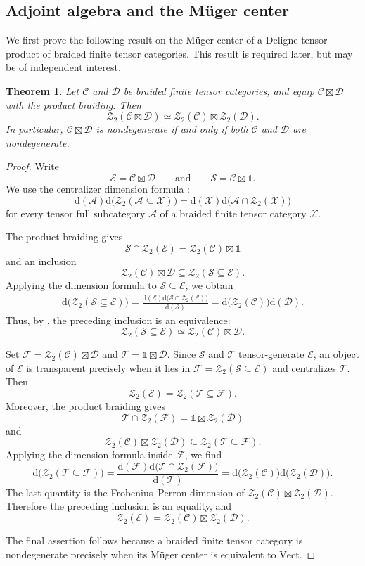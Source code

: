 \documentclass[10pt,a4paper]{amsart}
\numberwithin{equation}{section}
\newtheorem{theorem}[thmctr]{Theorem}
\newcommand{\unit}{\mathds{1}}
\newcommand{\cA}{\mathcal{A}}
\newcommand{\C}{\mathcal{C}}
\newcommand{\D}{\mathcal{D}}
\newcommand{\E}{\mathcal{E}}
\newcommand{\F}{\mathcal{F}}
\newcommand{\Z}{\mathcal{Z}}
\newcommand{\T}{\mathcal{T}}
\newcommand{\cS}{\mathcal{S}}
\newcommand{\FP}{\mathrm{d}}
\newcommand{\Vect}{\mathrm{Vect}}
\begin{document}
\subsection{Adjoint algebra and the M\"uger center}
We first prove the following result on the M\"uger center of a Deligne tensor product of braided finite tensor categories. This result is required later, but may be of independent interest.

\begin{theorem}\label{thm:muger-center-deligne-product}
Let $\C$ and $\D$ be braided finite tensor categories, and
equip $\C\boxtimes\D$ with the product braiding. Then
\[
\Z_2(\C\boxtimes\D)
\simeq
\Z_2(\C)\boxtimes\Z_2(\D).
\]
In particular, $\C\boxtimes\D$ is nondegenerate if and only if
both $\C$ and $\D$ are nondegenerate.
\end{theorem}

\begin{proof}
Write
\[
\E=\C\boxtimes\D
\qquad\text{and}\qquad
\cS=\C\boxtimes\unit.
\]
We use the centralizer dimension formula
\cite[Theorem~4.9]{shimizu2019non}:
\[
\FP(\cA)
\FP\bigl(\Z_2(\cA\subseteq\mathcal X)\bigr)
=
\FP(\mathcal X)
\FP\bigl(\cA\cap\Z_2(\mathcal X)\bigr)
\]
for every tensor full subcategory $\cA$ of a braided finite tensor
category $\mathcal X$.

The product braiding gives
\[
\cS\cap\Z_2(\E)
=
\Z_2(\C)\boxtimes\unit
\]
and an inclusion
\[
\Z_2(\C)\boxtimes\D
\subseteq
\Z_2(\cS\subseteq\E).
\]
Applying the dimension formula to $\cS\subseteq\E$, we obtain
\[
\begin{aligned}
\FP\bigl(\Z_2(\cS\subseteq\E)\bigr)
=
\frac{
 \FP(\E)
 \FP\bigl(\cS\cap\Z_2(\E)\bigr)
}{
 \FP(\cS)
} 
=
\FP\bigl(\Z_2(\C)\bigr)
\FP(\D).
\end{aligned}
\]
Thus, by \cite[Proposition~6.3.3]{etingof2016tensor}, the preceding inclusion is an equivalence:
\[
  \Z_2(\cS\subseteq\E)\simeq\Z_2(\C)\boxtimes\D.
\]

Set $\F = \Z_2(\C)\boxtimes\D$ and $\T=\unit\boxtimes\D$. 
Since $\cS$ and $\T$ tensor-generate $\E$, an object of
$\E$ is transparent precisely when it lies in
$\F=\Z_2(\cS\subseteq\E)$ and centralizes $\T$. Then
\[
\Z_2(\E) = \Z_2(\T\subseteq\F).
\]
Moreover, the product braiding gives
\[
\T\cap\Z_2(\F)
=
\unit\boxtimes\Z_2(\D)
\]
and
\[
\Z_2(\C)\boxtimes\Z_2(\D)
\subseteq
\Z_2(\T\subseteq\F).
\]
Applying the dimension formula inside $\F$, we find
\begin{equation*}
\FP\bigl(\Z_2(\T\subseteq\F)\bigr)
=
\frac{
  \FP(\F)\FP\bigl(\T\cap\Z_2(\F)\bigr)
}{
  \FP(\T)
}
= \FP\bigl(\Z_2(\C)\bigr) \FP\bigl(\Z_2(\D)\bigr).
\end{equation*}
The last quantity is the Frobenius--Perron dimension of
$\Z_2(\C)\boxtimes\Z_2(\D)$. Therefore the
preceding inclusion is an equality, and
\[
\Z_2(\E)
=
\Z_2(\C)\boxtimes\Z_2(\D).
\]

The final assertion follows because a braided finite tensor category is
nondegenerate precisely when its M\"uger center is equivalent to $\Vect$.
\end{proof}
\end{document}
